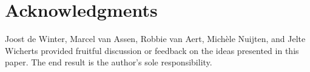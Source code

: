 \section*{Acknowledgments}
Joost de Winter, Marcel van Assen, Robbie van Aert, Michèle Nuijten, and Jelte Wicherts provided fruitful discussion or feedback on the ideas presented in this paper. The end result is the author’s sole responsibility.
  
  